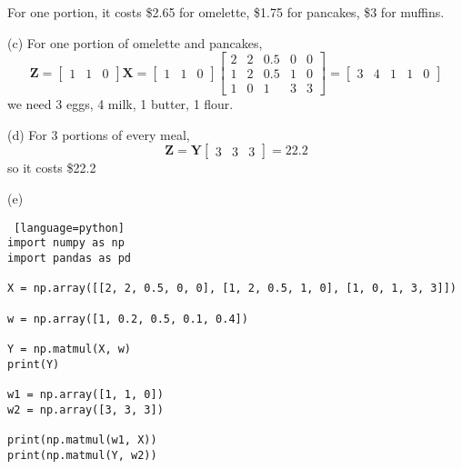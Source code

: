 \documentclass[a4paper, 12pt]{article}
\begin{document}
\begin{solution}
    For one portion, it costs \$2.65 for omelette, \$1.75 for pancakes, \$3 for muffins.

    (c) For one portion of omelette and pancakes,
    \[
        \mathbf{Z} = \begin{bmatrix}
            1 & 1 & 0
        \end{bmatrix} \mathbf{X} =  \begin{bmatrix}
            1 & 1 & 0
        \end{bmatrix}\begin{bmatrix}
            2 & 2 & 0.5 & 0 & 0 \\
            1 & 2 & 0.5 & 1 & 0 \\
            1 & 0 & 1   & 3 & 3
        \end{bmatrix} = \begin{bmatrix}
        3 & 4 & 1 & 1 & 0
        \end{bmatrix}
    \]
    we need 3 eggs, 4 milk, 1 butter, 1 flour.

    (d) For 3 portions of every meal,
    \[
        \mathbf{Z} = \mathbf{Y} \begin{bmatrix}
            3 & 3 & 3
        \end{bmatrix} = 22.2
    \]
    so it costs \$22.2

    (e)
    \begin{lstlisting} [language=python]
import numpy as np
import pandas as pd

X = np.array([[2, 2, 0.5, 0, 0], [1, 2, 0.5, 1, 0], [1, 0, 1, 3, 3]])

w = np.array([1, 0.2, 0.5, 0.1, 0.4])

Y = np.matmul(X, w)
print(Y)

w1 = np.array([1, 1, 0])
w2 = np.array([3, 3, 3])

print(np.matmul(w1, X))
print(np.matmul(Y, w2))
    \end{lstlisting}
\end{solution}
\end{document}
